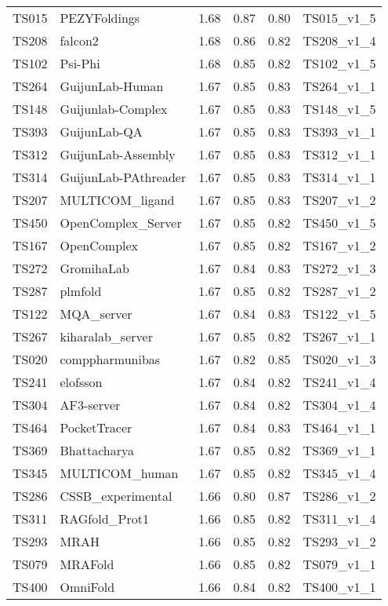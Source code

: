 \begin{longtable}{llllll}
TS015 & PEZYFoldings & 1.68 & 0.87 & 0.80 & TS015\_v1\_5 \\ 
TS208 & falcon2 & 1.68 & 0.86 & 0.82 & TS208\_v1\_4 \\ 
TS102 & Psi-Phi & 1.68 & 0.85 & 0.82 & TS102\_v1\_5 \\ 
TS264 & GuijunLab-Human & 1.67 & 0.85 & 0.83 & TS264\_v1\_1 \\ 
TS148 & Guijunlab-Complex & 1.67 & 0.85 & 0.83 & TS148\_v1\_5 \\ 
TS393 & GuijunLab-QA & 1.67 & 0.85 & 0.83 & TS393\_v1\_1 \\ 
TS312 & GuijunLab-Assembly & 1.67 & 0.85 & 0.83 & TS312\_v1\_1 \\ 
TS314 & GuijunLab-PAthreader & 1.67 & 0.85 & 0.83 & TS314\_v1\_1 \\ 
TS207 & MULTICOM\_ligand & 1.67 & 0.85 & 0.83 & TS207\_v1\_2 \\ 
TS450 & OpenComplex\_Server & 1.67 & 0.85 & 0.82 & TS450\_v1\_5 \\ 
TS167 & OpenComplex & 1.67 & 0.85 & 0.82 & TS167\_v1\_2 \\ 
TS272 & GromihaLab & 1.67 & 0.84 & 0.83 & TS272\_v1\_3 \\ 
TS287 & plmfold & 1.67 & 0.85 & 0.82 & TS287\_v1\_2 \\ 
TS122 & MQA\_server & 1.67 & 0.84 & 0.83 & TS122\_v1\_5 \\ 
TS267 & kiharalab\_server & 1.67 & 0.85 & 0.82 & TS267\_v1\_1 \\ 
TS020 & comppharmunibas & 1.67 & 0.82 & 0.85 & TS020\_v1\_3 \\ 
TS241 & elofsson & 1.67 & 0.84 & 0.82 & TS241\_v1\_4 \\ 
TS304 & AF3-server & 1.67 & 0.84 & 0.82 & TS304\_v1\_4 \\ 
TS464 & PocketTracer & 1.67 & 0.84 & 0.83 & TS464\_v1\_1 \\ 
TS369 & Bhattacharya & 1.67 & 0.85 & 0.82 & TS369\_v1\_1 \\ 
TS345 & MULTICOM\_human & 1.67 & 0.85 & 0.82 & TS345\_v1\_4 \\ 
TS286 & CSSB\_experimental & 1.66 & 0.80 & 0.87 & TS286\_v1\_2 \\ 
TS311 & RAGfold\_Prot1 & 1.66 & 0.85 & 0.82 & TS311\_v1\_4 \\ 
TS293 & MRAH & 1.66 & 0.85 & 0.82 & TS293\_v1\_2 \\ 
TS079 & MRAFold & 1.66 & 0.85 & 0.82 & TS079\_v1\_1 \\ 
TS400 & OmniFold & 1.66 & 0.84 & 0.82 & TS400\_v1\_1 \\ 

\end{longtable}

